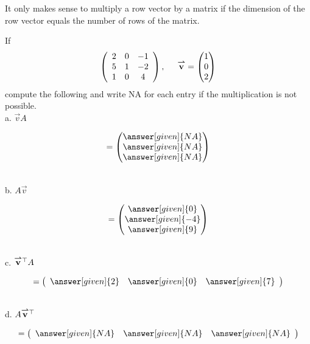 \documentclass{ximera}
\begin{document}
\begin{warning}
  It only makes sense to multiply a row vector by a matrix if the
  dimension of the row vector equals the number of rows of the
  matrix.
\end{warning}


\begin{question}
If 
\[
\left(\begin{array}{ccc}
2 & 0 & -1\\
5 & 1 & -2\\
1 & 0 & 4
\end{array}\right), \hspace{.5cm} \vec{v} = \begin{pmatrix}
1 \\
0\\
2
\end{pmatrix}
\]
compute the following and write NA for each entry if the multiplication is not possible. \\

a. $\vec{v} A$ \begin{prompt} \[=\begin{pmatrix}
\answer[given]{NA}\\
\answer[given]{NA}\\
\answer[given]{NA}
\end{pmatrix}\]
\end{prompt}\\

b. $A\vec{v}$ \begin{prompt} \[= \begin{pmatrix}
\answer[given]{0}\\
\answer[given]{-4}\\
\answer[given]{9}
\end{pmatrix}\]\end{prompt}\\

c. $\vec{v}^{\transpose} A$ \begin{prompt} \[= \left(\begin{array}{ccc}
\answer[given]{2} & \answer[given]{0} & \answer[given]{7}
\end{array}\right)\]
\end{prompt}\\

d. $A\vec{v}^{\transpose}$ \begin{prompt} \[= \left(\begin{array}{ccc}
\answer[given]{NA} & \answer[given]{NA} & \answer[given]{NA}
\end{array}\right)\]
\end{prompt}
\end{question}
\end{document}
